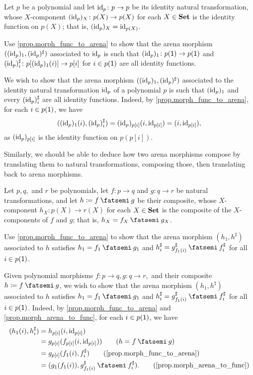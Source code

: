 \documentclass[Book-Poly]{subfiles}
\begin{document}
\begin{exercise} \label{exc.arena_morph_id}
Let $p$ be a polynomial and let $\mathrm{id}_p \colon p \to p$ be its identity natural transformation, whose $X$-component $(\mathrm{id}_p)_X \colon p(X) \to p(X)$ for each $X \in \mathbf{Set}$ is the identity function on $p(X)$; that is, $(\mathrm{id}_p)_X = \mathrm{id}_{p(X)}$.

Use \cref{prop.morph_func_to_arena} to show that the arena morphism $((\mathrm{id}_p)_1, (\mathrm{id}_p)^\sharp)$ associated to $\mathrm{id}_p$ is such that $(\mathrm{id}_p)_1 \colon p(\textsf{1}) \to p(\textsf{1})$ and $(\mathrm{id}_p)^\sharp_i \colon p[(\mathrm{id}_p)_1(i)] \to p[i]$ for $i \in p(\textsf{1})$ are all identity functions.
\begin{solution}
We wish to show that the arena morphism $((\mathrm{id}_p)_1, (\mathrm{id}_p)^\sharp)$ associated to the identity natural transformation $\mathrm{id}_p$ of a polynomial $p$ is such that $(\mathrm{id}_p)_1$ and every $(\mathrm{id}_p)^\sharp_i$ are all identity functions.
Indeed, by \cref{prop.morph_func_to_arena}, for each $i \in p(\textsf{1})$, we have
\[
    ((\mathrm{id}_p)_1(i), (\mathrm{id}_p)^\sharp_i) = (\mathrm{id}_p)_{p[i]}(i, \mathrm{id}_{p[i]}) = (i, \mathrm{id}_{p[i]}),
\]
as $(\mathrm{id}_p)_{p[i]}$ is the identity function on $p(p[i])$.
\end{solution}
\end{exercise}

Similarly, we should be able to deduce how two arena morphisms compose by translating them to natural transformations, composing those, then translating back to arena morphisms.

\begin{exercise} \label{exc.arena_morph_comp}
Let $p,q,$ and $r$ be polynomials, let $f \colon p \to q$ and $g \colon q \to r$ be natural transformations, and let $h \coloneqq f \then g$ be their composite, whose $X$-component $h_X \colon p(X) \to r(X)$ for each $X \in \mathbf{Set}$ is the composite of the $X$-components of $f$ and $g$; that is, $h_X = f_X \then g_X$.

Use \cref{prop.morph_func_to_arena} to show that the arena morphism $(h_1, h^\sharp)$ associated to $h$ satisfies $h_1 = f_1 \then g_1$ and $h^\sharp_i = g^\sharp_{f_1(i)} \then f^\sharp_i$ for all $i \in p(\textsf{1})$.
\begin{solution}
Given polynomial morphisms $f \colon p \to q, g \colon q \to r,$ and their composite $h \coloneqq f \then g$, we wish to show that the arena morphism $(h_1, h^\sharp)$ associated to $h$ satisfies $h_1 = f_1 \then g_1$ and $h^\sharp_i = g^\sharp_{f_1(i)} \then f^\sharp_i$ for all $i \in p(\textsf{1})$.
Indeed, by \cref{prop.morph_func_to_arena} and \cref{prop.morph_arena_to_func}, for each $i \in p(\textsf{1})$, we have
\begin{align*}
    (h_1(i), h^\sharp_i) &= h_{p[i]}(i, \id_{p[i]}) \\
    &= g_{p[i]}(f_{p[i]}(i, \id_{p[i]})) \tag{$h = f \then g$} \\
    &= g_{p[i]}(f_1(i), f^\sharp_i) \tag{\cref{prop.morph_func_to_arena}} \\
    &= (g_1(f_1(i)), g^\sharp_{f_1(i)} \then f^\sharp_i). \tag{\cref{prop.morph_arena_to_func}}
\end{align*}
\end{solution}
\end{exercise}
\end{document}

